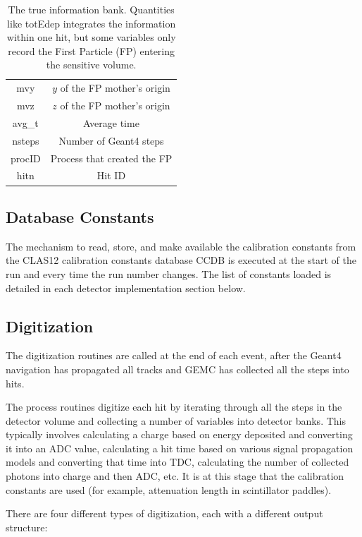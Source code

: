 \begin{table}[h]
\begin{center}
\begin{tabular}{| c | c |}
				mvy         &   $y$  of the FP mother's origin \\
				mvz         &   $z$  of the FP mother's origin \\
				avg\_t      &   Average time \\
				nsteps      &   Number of Geant4 steps \\
				procID      &   Process that created the FP  \\
				hitn        &   Hit ID \\
			\hline \hline
		\end{tabular}
	\end{center}
	\caption{The true information bank. Quantities like totEdep integrates the information within one hit, but some
             variables only record the First Particle (FP) entering the sensitive volume.}\label{tab:trueInformation}
\end{table}


\subsection{Database Constants}

The mechanism to read, store, and make available the calibration constants from the CLAS12
calibration constants database CCDB \cite{ccdb} is
executed at the start of the run and every time the run number changes.
The list of constants loaded is detailed in each detector implementation section below.

\subsection{Digitization}

The digitization routines are called at the end of each event, after the Geant4 navigation
has propagated all tracks and GEMC has collected all the steps into hits.

The process routines digitize each hit by iterating through all the steps in the detector volume and collecting
a number of variables into detector banks. This typically involves calculating a charge based
on energy deposited and converting it into an ADC value, calculating a hit time based
on various signal propagation models and converting that time into TDC, calculating the number
of collected photons into charge and then ADC, etc. It is at this stage that the calibration
constants are used (for example, attenuation length in scintillator paddles).

There are four different types of digitization, each with a different output structure:

